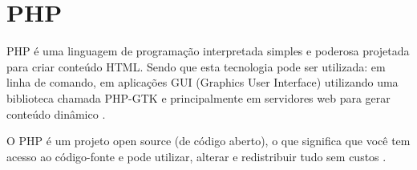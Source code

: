 \chapter{PHP}
\label{php}

PHP é uma linguagem de programação interpretada simples e poderosa projetada 
para criar conteúdo HTML. Sendo que esta tecnologia pode ser utilizada: em 
linha de comando, em aplicações GUI (Graphics User Interface) utilizando uma 
biblioteca chamada PHP-GTK e principalmente em servidores web para gerar 
conteúdo dinâmico \cite{programmingPhp}.

O PHP é um projeto open source (de código aberto), o que significa que você tem
acesso ao código-fonte e pode utilizar, alterar e redistribuir tudo sem custos
\cite{phpAndMysqlWebDevelopment}.
